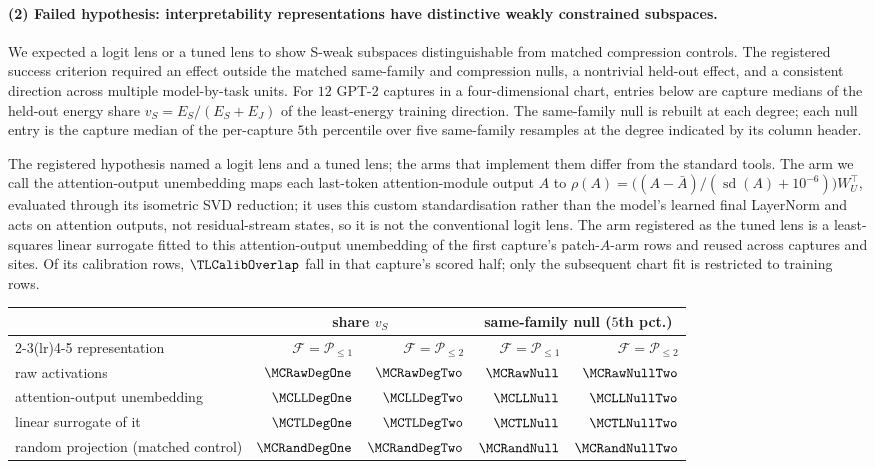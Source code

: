 \paragraph{(2) Failed hypothesis: interpretability representations have distinctive weakly constrained subspaces.} We expected a logit
lens or a tuned lens to show S-weak subspaces distinguishable from matched compression controls. The registered success criterion required an effect outside the matched same-family and
compression nulls, a nontrivial held-out effect, and a consistent direction across multiple model-by-task units.
For $12$ GPT-2 captures in a four-dimensional chart, entries below are capture medians of the held-out energy share
$v_S=E_S/(E_S+E_J)$ of the least-energy training direction. The same-family null is rebuilt at each degree; each null
entry is the capture median of the per-capture $5$th percentile over five same-family resamples at the degree
indicated by its column header.

The registered hypothesis named a logit lens and a tuned lens; the arms that implement them differ from the standard
tools. The arm we call the attention-output unembedding maps each
last-token attention-module output $A$ to $\rho(A)=\bigl((A-\bar A)/(\operatorname{sd}(A)+10^{-6})\bigr)W_U^{\top}$,
evaluated through its isometric SVD reduction; it uses this custom standardisation rather than the model's learned final
LayerNorm and acts on attention outputs, not residual-stream states, so it is not the conventional logit lens. The arm
registered as the tuned lens is a least-squares linear surrogate fitted to this attention-output
unembedding of the first capture's patch-$A$-arm rows and reused across captures and
sites. Of its calibration rows, $\TLCalibOverlap$ fall in that capture's scored half; only the subsequent chart
fit is restricted to training rows.

\begin{center}\small
\begin{tabular}{lrrrr}
\toprule
 & \multicolumn{2}{c}{share $v_S$} & \multicolumn{2}{c}{same-family null ($5$th pct.)} \\
\cmidrule(lr){2-3}\cmidrule(lr){4-5}
representation & $\mathcal F=\mathcal P_{\le1}$ & $\mathcal F=\mathcal P_{\le2}$ & $\mathcal F=\mathcal P_{\le1}$ & $\mathcal F=\mathcal P_{\le2}$ \\
\midrule
raw activations & $\MCRawDegOne$ & $\MCRawDegTwo$ & $\MCRawNull$ & $\MCRawNullTwo$ \\
attention-output unembedding & $\MCLLDegOne$  & $\MCLLDegTwo$  & $\MCLLNull$ & $\MCLLNullTwo$ \\
linear surrogate of it & $\MCTLDegOne$  & $\MCTLDegTwo$  & $\MCTLNull$ & $\MCTLNullTwo$ \\
\midrule
random projection (matched control) & $\MCRandDegOne$ & $\MCRandDegTwo$ & $\MCRandNull$ & $\MCRandNullTwo$ \\
\bottomrule
\end{tabular}
\end{center}

